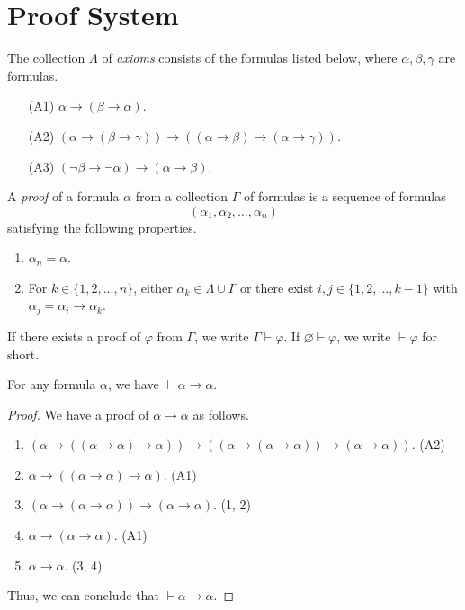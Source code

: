 \section{Proof System}
\begin{definition}
  The collection $\Lambda$ of \emph{axioms} consists of the formulas listed
  below, where $\alpha, \beta, \gamma$ are formulas.
  \begin{enumerate}[leftmargin=3.5em]
    \item[(A1)] $\alpha \to (\beta \to \alpha)$.
    \item[(A2)] $(\alpha \to (\beta \to \gamma)) \to
    ((\alpha \to \beta) \to (\alpha \to \gamma))$.
    \item[(A3)] $(\neg \beta \to \neg \alpha) \to (\alpha \to \beta)$.
  \end{enumerate}
\end{definition}

\begin{definition}
  A \emph{proof} of a formula $\alpha$ from a collection $\Gamma$ of formulas
  is a sequence of formulas
  \begin{equation*}
    (\alpha_1, \alpha_2, \dots, \alpha_n)
  \end{equation*}
  satisfying the following properties.
  \begin{enumerate}
    \item $\alpha_n = \alpha$.
    \item For $k \in \{1, 2, \dots, n\}$, either
    $\alpha_k \in \Lambda \cup \Gamma$ or there exist
    $i, j \in \{1, 2, \dots, k-1\}$ with $\alpha_j = \alpha_i \to \alpha_k$.
  \end{enumerate}
  If there exists a proof of $\varphi$ from $\Gamma$, we write
  $\Gamma \vdash \varphi$.
  If $\varnothing \vdash \varphi$, we write $\vdash \varphi$ for short.
\end{definition}

\begin{theorem}
  \label{thm:identity}
  For any formula $\alpha$, we have $\vdash \alpha \to \alpha$.
\end{theorem}
\begin{proof}
  We have a proof of $\alpha \to \alpha$ as follows.
  \begin{enumerate}[1.]
    \item $(\alpha \to ((\alpha \to \alpha) \to \alpha)) \to
    ((\alpha \to (\alpha \to \alpha)) \to (\alpha \to \alpha))$.
    \hfill (A2)
    \item $\alpha \to ((\alpha \to \alpha) \to \alpha)$. \hfill (A1)
    \item $(\alpha \to (\alpha \to \alpha)) \to (\alpha \to \alpha)$.
    \hfill (1, 2)
    \item $\alpha \to (\alpha \to \alpha)$. \hfill (A1)
    \item $\alpha \to \alpha$. \hfill (3, 4)
  \end{enumerate}
  Thus, we can conclude that $\vdash \alpha \to \alpha$.
\end{proof}

